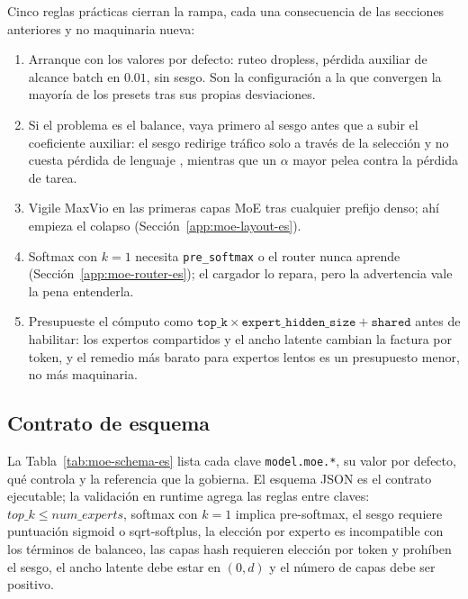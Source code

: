 Cinco reglas prácticas cierran la rampa, cada una consecuencia de las secciones
anteriores y no maquinaria nueva:
\begin{enumerate}[leftmargin=1.4em]
  \item Arranque con los valores por defecto: ruteo dropless, pérdida auxiliar
        de alcance batch en $0.01$, sin sesgo. Son la configuración a la que
        convergen la mayoría de los presets tras sus propias desviaciones.
  \item Si el problema es el balance, vaya primero al sesgo antes que a subir
        el coeficiente auxiliar: el sesgo redirige tráfico solo a través de la
        selección y no cuesta pérdida de lenguaje \citep{wang2024auxfree},
        mientras que un $\alpha$ mayor pelea contra la pérdida de tarea.
  \item Vigile MaxVio en las primeras capas MoE tras cualquier prefijo denso;
        ahí empieza el colapso (Sección~\ref{app:moe-layout-es}).
  \item Softmax con $k{=}1$ necesita \texttt{pre\_softmax} o el router nunca
        aprende (Sección~\ref{app:moe-router-es}); el cargador lo repara, pero
        la advertencia vale la pena entenderla.
  \item Presupueste el cómputo como
        $\texttt{top\_k} \times \texttt{expert\_hidden\_size} +
        \texttt{shared}$ antes de habilitar: los expertos compartidos y el
        ancho latente cambian la factura por token, y el remedio más barato
        para expertos lentos es un presupuesto menor, no más maquinaria.
\end{enumerate}

\subsection{Contrato de esquema}
\label{app:moe-schema-es}

La Tabla~\ref{tab:moe-schema-es} lista cada clave \texttt{model.moe.*}, su
valor por defecto, qué controla y la referencia que la gobierna. El esquema
JSON es el contrato ejecutable; la validación en runtime agrega las reglas
entre claves: $top\_k \leqslant num\_experts$, softmax con $k=1$ implica
pre-softmax, el sesgo requiere puntuación sigmoid o sqrt-softplus, la elección
por experto es incompatible con los términos de balanceo, las capas hash
requieren elección por token y prohíben el sesgo, el ancho latente debe estar
en $(0, d)$ y el número de capas debe ser positivo.

